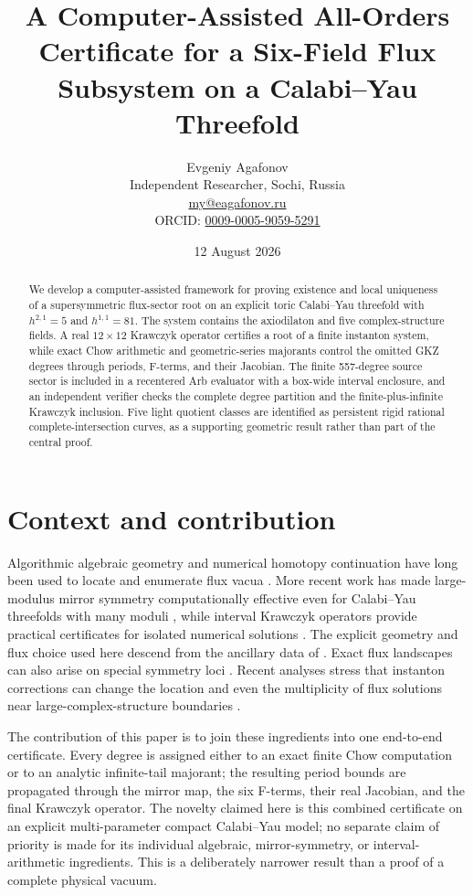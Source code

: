 \documentclass[11pt]{article}
\title{A Computer-Assisted All-Orders Certificate for a Six-Field
Flux Subsystem on a Calabi--Yau Threefold}
\author{Evgeniy Agafonov\\
\small Independent Researcher, Sochi, Russia\\
\small \href{mailto:my@eagafonov.ru}{my@eagafonov.ru}\\
\small ORCID: \href{https://orcid.org/0009-0005-9059-5291}{0009-0005-9059-5291}}
\date{12 August 2026}
\begin{document}
\maketitle

\begin{abstract}
We develop a computer-assisted framework for proving existence and local
uniqueness of a supersymmetric flux-sector root on an explicit toric
Calabi--Yau threefold with $h^{2,1}=5$ and $h^{1,1}=81$.  The system contains
the axiodilaton and five complex-structure fields.  A real $12\times12$
Krawczyk operator certifies a root of a finite instanton system, while exact
Chow arithmetic and geometric-series majorants control the omitted GKZ
degrees through periods, F-terms, and their Jacobian.  The finite 557-degree
source sector is included in a recentered Arb evaluator with a box-wide
interval enclosure, and an independent verifier checks the complete degree
partition and the finite-plus-infinite Krawczyk inclusion. Five light quotient
classes are identified as persistent rigid rational complete-intersection
curves, as a supporting geometric result rather than part of the central proof.
\end{abstract}

\section{Context and contribution}

Algorithmic algebraic geometry and numerical homotopy continuation have long
been used to locate and enumerate flux vacua
\cite{Gray2006,Mehta2011,MartinezPedrera2013}. More recent work has made
large-modulus mirror symmetry computationally effective even for Calabi--Yau
threefolds with many moduli \cite{Demirtas2024}, while interval Krawczyk
operators provide practical certificates for isolated numerical solutions
\cite{Breiding2024}. The explicit geometry and flux choice used here descend
from the ancillary data of \cite{Demirtas2021}. Exact flux landscapes can
also arise on special symmetry loci \cite{Grimm2024}. Recent analyses stress
that instanton corrections can change the location and even the multiplicity
of flux solutions near large-complex-structure boundaries
\cite{Chauhan2026}.

The contribution of this paper is to join these ingredients into one
end-to-end certificate. Every degree is assigned either to an exact finite
Chow computation or to an analytic infinite-tail majorant; the resulting
period bounds are propagated through the mirror map, the six F-terms, their
real Jacobian, and the final Krawczyk operator. The novelty claimed here is
this combined certificate on an explicit multi-parameter compact
Calabi--Yau model; no separate claim of priority is made for its individual
algebraic, mirror-symmetry, or interval-arithmetic ingredients. This is a
deliberately narrower result than a proof of a complete physical vacuum.
\end{document}
